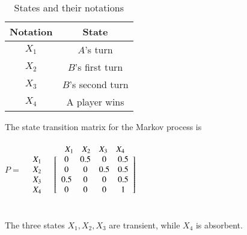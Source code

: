 \documentclass[journal,12pt,twocolumn]{IEEEtran}
\begin{document}
\begin{table}[h!]
\centering
\caption{States and their notations}
\label{table:2}
\begin{tabular}{|c|c|}
    \hline
    Notation & State \\
    \hline
    $X_{1}$ & $A$'s turn\\[1ex]
    \hline
    $X_{2}$ & $B$'s first turn\\[1ex]
    \hline
    $X_{3}$ & $B$'s second turn\\[1ex]
    \hline
    $X_{4}$ & A player wins\\[1ex]
    \hline
\end{tabular}
\end{table}
\newpage
The state transition matrix for the Markov process is \\\\$P=$
$\begin{array}{c c} &
\begin{array}{c c c c} X_{1}  & X_{2} & X_{3} & X_{4}\\
\end{array}
\\
\begin{array}{c c c}
X_{1} \\
X_{2}\\
X_{3}\\
X_{4}
\end{array}
&
\left[
\begin{array}{c c c c}
0 & 0.5 & 0 & 0.5 \\
0 & 0 & 0.5 & 0.5 \\
0.5 & 0 & 0 & 0.5 \\
0 & 0 & 0 & 1  
\end{array}
\right]
\end{array}$
\\\\\\
The three states $X_{1},X_{2},X_{3}$ are transient, while $X_{4}$ is absorbent.
\end{document}
